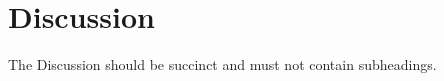\documentclass[10pt,a4paper]{article}
\begin{document}
\section*{Discussion}
The Discussion should be succinct and must not contain subheadings.
%

{}

\end{document}
